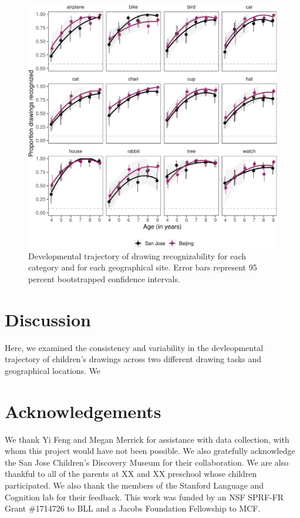 \documentclass[
  english,
  man]{apa6}
\begin{document}
\begin{figure}[H]

{\centering \includegraphics[width=\textwidth]{Manuscript_June2021_files/figure-latex/item-effects-1} 

}

\caption{Developmental trajectory of drawing recognizability for each category and for each geographical site. Error bars represent 95 percent bootstrapped confidence intervals.}\label{fig:item-effects}
\end{figure}

\hypertarget{discussion}{%
\section{Discussion}\label{discussion}}

Here, we examined the consistency and variability in the devleopmental trajectory of children's drawings across two different drawing tasks and geographical locations. We

\hypertarget{acknowledgements}{%
\section{Acknowledgements}\label{acknowledgements}}

We thank Yi Feng and Megan Merrick for assistance with data collection, with whom this project would have not been possible. We also gratefully acknowledge the San Jose Children's Discovery Museum for their collaboration. We are also thankful to all of the parents at XX and XX preschool whose children participated. We also thank the members of the Stanford Language and Cognition lab for their feedback. This work was funded by an NSF SPRF-FR Grant \#1714726 to BLL and a Jacobs Foundation Fellowship to MCF.
\end{document}
